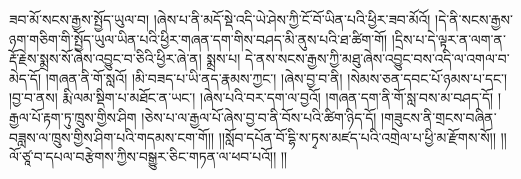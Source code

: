ཟབ་མོ་སངས་རྒྱས་སྤྱོད་ཡུལ་བ། །ཞེས་པ་ནི་མདོ་སྡེ་འདི་ཡེ་ཤེས་ཀྱི་ངོ་བོ་ཡིན་པའི་ཕྱིར་ཟབ་མོའོ། །དེ་ནི་སངས་རྒྱས་ཉག་གཅིག་གི་སྤྱོད་ཡུལ་ཡིན་པའི་ཕྱིར་གཞན་དག་གིས་བཤད་མི་ནུས་པའི་ཐ་ཚིག་གོ། །དྲིས་པ་དེ་ལྟར་ན་ལག་ན་རྡོ་རྗེས་སྨྲས་སོ་ཞེས་འབྱུང་བ་ཅིའི་ཕྱིར་ཞེ་ན། སྨྲས་པ། དེ་ནས་སངས་རྒྱས་ཀྱི་མཐུ་ཞེས་འབྱུང་བས་འདི་ལ་འགལ་བ་མེད་དོ། །གཞན་ནི་གོ་སླའོ། །མི་བཟད་པ་ཡི་ནད་རྣམས་ཀྱང་། །ཞེས་བྱ་བ་ནི། །སེམས་ཅན་དབང་པོ་ཉམས་པ་དང་། །བྱ་བ་ནས། རྨི་ལམ་སྡིག་པ་མཐོང་ན་ཡང་། །ཞེས་པའི་བར་དག་ལ་བྱའོ། །གཞན་དག་ནི་གོ་སླ་བས་མ་བཤད་དོ། །རྒྱལ་པོ་རྟག་ཏུ་ཁྲུས་གྱིས་ཤིག །ཅེས་པ་ལ་རྒྱལ་པོ་ཞེས་བྱ་བ་ནི་བོས་པའི་ཚིག་ཉིད་དོ། །གཟུངས་ནི་གྲངས་བཞིན་བཟླས་ལ་ཁྲུས་གྱིས་ཤིག་པའི་གདམས་ངག་གོ།། །།སློབ་དཔོན་བོ་དྷི་ས་ཏྭས་མཛད་པའི་འགྲེལ་པ་ཕྱི་མ་རྫོགས་སོ།། །།ལོ་ཙཱ་བ་དཔལ་བརྩེགས་ཀྱིས་བསྒྱུར་ཅིང་གཏན་ལ་ཕབ་པའོ།། །།